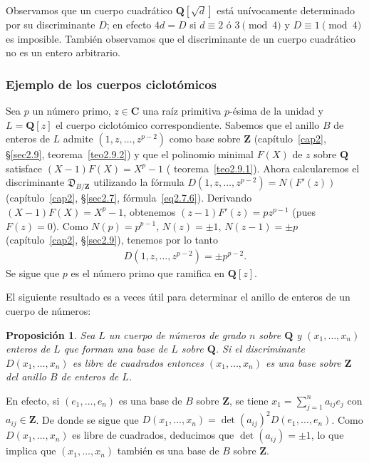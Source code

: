\documentclass[bibtotoc,leqno,spanish]{amsbook}
\let\emph\relax %
\newcommand{\QQ}{\mathbf{Q}}
\newcommand{\ZZ}{\mathbf{Z}}
\newcommand{\CC}{\mathbf{C}}
\newcommand{\disc}{\mathfrak{D}}
\numberwithin{equation}{section}
\theoremstyle{note}
\theoremstyle{note}
\newtheorem{proposition}{Proposici\'on}
\theoremstyle{rem}
\numberwithin{theorem}{section}
\numberwithin{proposition}{section}
\numberwithin{definition}{section}
\numberwithin{lemma}{section}
\numberwithin{corollary}{section}
\numberwithin{example}{section}
\numberwithin{footnote}{section}%
\begin{document}
Observamos que un cuerpo cuadr\'atico $\QQ[\sqrt{d}]$ est\'a un\'ivocamente determinado por su discriminante
$D$; en efecto $4d = D$ si $d\equiv 2\text{ \'o }3\pmod 4$ y $D\equiv 1\pmod 4$ es imposible. Tambi\'en
observamos que el discriminante de un cuerpo cuadr\'atico no es un entero arbitrario.

\subsubsection*{Ejemplo de los cuerpos ciclot\'omicos}

Sea $p$ un n\'umero primo, $z\in\CC$ una ra\'iz primitiva $p$-\'esima de la unidad y $L = \QQ[z]$
el cuerpo ciclot\'omico correspondiente. Sabemos que el anillo $B$ de enteros de $L$ admite $(1,z,\dots,z^{p-2})$
como base sobre $\ZZ$ (cap\'itulo~\ref{cap2}, \S\ref{sec2.9}, teorema~\ref{teo2.9.2})
y que el polinomio minimal $F(X)$ de $z$ sobre $\QQ$
satisface $(X-1)F(X) = X^{p}-1$ (\emph{ibid;} teorema~\ref{teo2.9.1}). Ahora calcularemos el discriminante $\disc_{B/\ZZ}$ utilizando
la f\'ormula $D(1,z,\dots,z^{p-2}) = N(F'(z))$ (cap\'itulo~\ref{cap2}, \S\ref{sec2.7}, f\'ormula~\eqref{eq2.7.6}).
Derivando $(X-1)F(X) = X^{p}-1$, obtenemos $(z-1)F'(z) = pz^{p-1}$ (pues $F(z) = 0$). Como
$N(p)=p^{p-1}$, $N(z) = \pm 1$, $N(z-1)=\pm p$ (cap\'itulo~\ref{cap2}, \S\ref{sec2.9}), tenemos por lo tanto
\begin{gather}
D(1,z,\dots,z^{p-2})=\pm p^{p-2}.
\end{gather}
Se sigue que $p$ es el \emph{\'unico} n\'umero primo que ramifica en $\QQ[z]$.

El siguiente resultado es a veces \'util para determinar el anillo de enteros de un cuerpo de n\'umeros:

\begin{proposition}
Sea $L$ un cuerpo de n\'umeros de grado $n$ sobre $\QQ$ y $(x_{1},\dots,x_{n})$ enteros de $L$
que forman una base de $L$ sobre $\QQ$. Si el discriminante $D(x_{1},\dots,x_{n})$ es libre de cuadrados
entonces $(x_{1},\dots,x_{n})$ es una base sobre $\ZZ$ del anillo $B$ de enteros de $L$.
\end{proposition}

En efecto, si $(e_{1},\dots,e_{n})$ es una base de $B$ sobre $\ZZ$, se tiene $x_{1}=\sum_{j=1}^{n}a_{ij}e_{j}$
con $a_{ij}\in\ZZ$. De donde se sigue que $D(x_{1},\dots,x_{n})=\det(a_{ij})^{2}D(e_{1},\dots,e_{n})$.
Como $D(x_{1},\dots,x_{n})$ es libre de cuadrados, deducimos que $\det(a_{ij})=\pm 1$, lo que implica que
$(x_{1},\dots,x_{n})$ tambi\'en es una base de $B$ sobre $\ZZ$.
\end{document}
